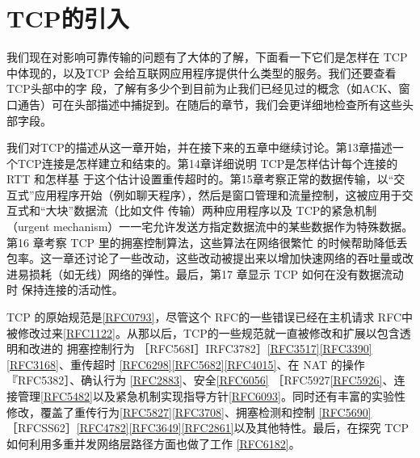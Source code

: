 \section{TCP的引入}
我们现在对影响可靠传输的问题有了大体的了解，下面看一下它们是怎样在 TCP 中体现的，以及TCP 会给互联网应用程序提供什么类型的服务。我们还要查看TCP头部中的字
段，了解有多少个到目前为止我们已经见过的概念（如ACK、窗口通告）可在头部描述中捕捉到。在随后的章节，我们会更详细地检查所有这些头部字段。

我们对TCP的描述从这一章开始，并在接下来的五章中继续讨论。第13章描述一个TCP连接是怎样建立和结束的。第14章详细说明 TCP是怎样估计每个连接的RTT 和怎样基
于这个估计设置重传超时的。第15章考察正常的数据传输，以“交互式”应用程序开始（例如聊天程序），然后是窗口管理和流量控制，这被应用于交互式和“大块”数据流（比如文件
传输）两种应用程序以及 TCP的紧急机制（urgent mechanism）一一宅允许发送方指定数据流中的某些数据作为特殊数据。第16 章考察 TCP 里的拥塞控制算法，这些算法在网络很繁忙
的时候帮助降低丢包率。这一章还讨论了一些改动，这些改动被提出来以增加快速网络的吞吐量或改进易损耗（如无线）网络的弹性。最后，第17 章显示 TCP 如何在没有数据流动时
保持连接的活动性。

TCP 的原始规范是\href{https://www.rfc-editor.org/rfc/rfc0793}{[RFC0793]}，尽管这个 RFC的一些错误已经在主机请求 RFC中被修改过来\href{https://www.rfc-editor.org/rfc/rfc1122}{[RFC1122]}。从那以后，TCP的一些规范就一直被修改和扩展以包含透明和改进的
拥塞控制行为 ［RFC568I］IRFC3782］\href{https://www.rfc-editor.org/rfc/rfc3517}{[RFC3517]}\href{https://www.rfc-editor.org/rfc/rfc3390}{[RFC3390]}\href{https://www.rfc-editor.org/rfc/rfc3168}{[RFC3168]}、重传超时 \href{https://www.rfc-editor.org/rfc/rfc6298}{[RFC6298]}\href{https://www.rfc-editor.org/rfc/rfc5682}{[RFC5682]}\href{https://www.rfc-editor.org/rfc/rfc4015}{[RFC4015]}、在 NAT 的操作『RFC5382］、确认行为 \href{https://www.rfc-editor.org/rfc/rfc2883}{[RFC2883]}、安全\href{https://www.rfc-editor.org/rfc/rfc6056}{[RFC6056]}
［RFC5927\href{https://www.rfc-editor.org/rfc/rfc5926}{[RFC5926]}、连接管理\href{https://www.rfc-editor.org/rfc/rfc5482}{[RFC5482]}以及紧急机制实现指导方针\href{https://www.rfc-editor.org/rfc/rfc6093}{[RFC6093]}。同时还有丰富的实验性修改，覆盖了重传行为\href{https://www.rfc-editor.org/rfc/rfc5827}{[RFC5827]}\href{https://www.rfc-editor.org/rfc/rfc3708}{[RFC3708]}、拥塞检测和控制 \href{https://www.rfc-editor.org/rfc/rfc5690}{[RFC5690]}
［RFCSS62］\href{https://www.rfc-editor.org/rfc/rfc4782}{[RFC4782]}\href{https://www.rfc-editor.org/rfc/rfc3649}{[RFC3649]}\href{https://www.rfc-editor.org/rfc/rfc2861}{[RFC2861]}以及其他特性。最后，在探究 TCP 如何利用多重并发网络层路径方面也做了工作 \href{https://www.rfc-editor.org/rfc/rfc6182}{[RFC6182]}。
